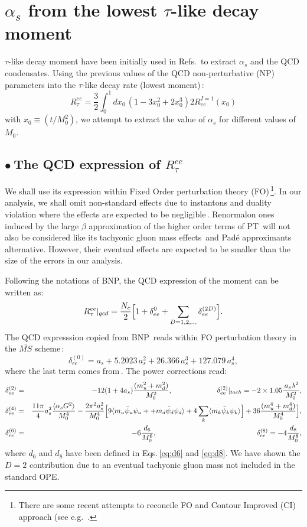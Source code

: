\documentclass[review]{elsarticle}
\def\beq{\begin{equation}}
\def\eeq{\end{equation}}
\def\bea{\begin{eqnarray}}
\def\eea{\end{eqnarray}}
\def\nnb{\nonumber}
\def\nnb{\nonumber}
\def\la{\langle}
\def\ra{\rangle}
\def\b{$\bullet~$}
\begin{document}
  \section{$\alpha_s$ from the lowest $\tau$-like decay moment}
  $\tau$-like decay moment have been initially used in Refs.\,\cite{SNPICH,SN95} to extract $\alpha_s$ and the QCD condensates. 
  Using the previous values of the QCD non-perturbative (NP) parameters into the $\tau$-like decay rate (lowest moment)\,\cite{BNP}:
  \beq
  R^{ee}_{\tau}=\frac{3}{2}\int_0^{1} dx_0\, (1-3x_0^2+2x_0^3)2R^{I=1}_{ee}(x_0)
  \eeq
  with $x_0\equiv (t/M^2_0)$, we attempt to extract the value of $\alpha_s$ for different values of $M_0$.
  \subsection*{\b The QCD expression of $ R^{ee}_{\tau}$}
 We shall use its expression  within Fixed Order perturbation theory (FO)\,\footnote{There are some recent attempts to reconcile FO and Contour Improved (CI) approach (see e.g. \,\cite{JAMIN}.}. In our analysis, we shall omit non-standard effects due to  instantons and duality violation where the effects are expected to be negligible\,\cite{PICH2,SNTAU}.  Renormalon ones induced by the large $\beta$ approximation of the higher order terms of PT\,\cite{RENORM,AYALA} will not also be considered like its tachyonic gluon mass effects\,\cite{ZAKA} and Pad\'e approximants alternative. However, their eventual effects are expected to be smaller than the size of the errors in our analysis. 
  
  Following the notations of BNP, the QCD expression of the moment can be written as:
  \beq
  R^{ee}_{\tau}\vert_{qcd}= \frac{N_c}{2}\Big{[} 1+\delta_{ee}^{0}+\sum_{D=1,2,\dots}\delta_{ee}^{(2D)}\Big{]}.
  \eeq
 The QCD expresssion copied from BNP\,\cite{BNP} reads within FO perturbation theory in the $\overline{MS}$ scheme\,:
  \beq
  \delta^{(0)}_{ee}=a_s+5.2023\,a_s^2+26.366\,a_s^3+ 127.079\,a_s^4,
  \eeq
  where the last term comes from\,\cite{CHET4}.  The power corrections read:
  \bea
   \delta^{(2)}_{ee}&=&-12(1+4a_s)\frac{(m_u^2+m_d^2)}{M_0^2},\,\,\,\,\,\,\,\,\,\,\,\,\,\,\,\,\,\,\,\,\,\,\,\,\,\,\,\,\,\,\,\,\,\,\,\,\,
   \delta^{(2)}_{ee}\vert_{tach}=-2\times 1.05\frac{\,a_s\lambda^2}{M_0^2},\nnb\\
   \delta^{(4)}_{ee}&=&\frac{11\pi}{4}a_s^2\frac{\la\alpha_s G^2\ra}{M_0^4}
  -\frac{2\pi^2a_s^2}{M_0^4}\Big{[} 9\la m_u\bar \psi_u\psi_u++m_d\bar\psi_d\psi_d \ra+4\sum_k \la m_k\bar \psi_k\psi_k\ra\Big{]}+36\frac{(m_u^4+m_d^4)}{M_0^4}\Big{]},\nnb\\
   \delta^{(6)}_{ee}&=& -6\frac{d_6}{M_0^6},\,\,\,\,\,\,\,\,\,\,\,\,\,\,\,\,\,\,\,\,\,\,\,\,\,\,\,\,\,\,\,\,\,\,\,\,\,\,\,\,\,\,\,\,\,\,\,\,\,\,\,\,\,\,\,\,\,\,\,\,\,\,\,\,\,\,\,\,\,\,\,\,\,\,\,\,\,\,\,\,\,\,\,
   \delta_{ee}^{(8)}= -4\frac{d_8}{M_0^8},
  \eea
  where $d_{6}$ and $d_{8}$ have been defined in Eqs.\,\ref{eq:d6} and \ref{eq:d8}. We have shown the $D=2$ contribution due to an eventual tachyonic gluon mass not included in the standard OPE. 
\end{document}
